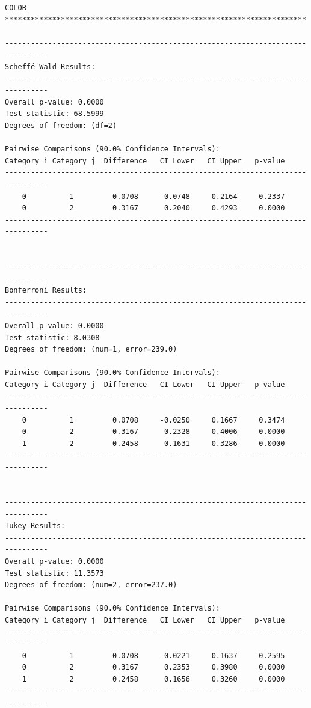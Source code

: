 \begin{lstlisting}
COLOR **********************************************************************

--------------------------------------------------------------------------------
Scheffé-Wald Results:
--------------------------------------------------------------------------------
Overall p-value: 0.0000
Test statistic: 68.5999
Degrees of freedom: (df=2)

Pairwise Comparisons (90.0% Confidence Intervals):
Category i Category j  Difference   CI Lower   CI Upper   p-value  
--------------------------------------------------------------------------------
    0          1         0.0708     -0.0748     0.2164     0.2337  
    0          2         0.3167      0.2040     0.4293     0.0000  
--------------------------------------------------------------------------------


--------------------------------------------------------------------------------
Bonferroni Results:
--------------------------------------------------------------------------------
Overall p-value: 0.0000
Test statistic: 8.0308
Degrees of freedom: (num=1, error=239.0)

Pairwise Comparisons (90.0% Confidence Intervals):
Category i Category j  Difference   CI Lower   CI Upper   p-value  
--------------------------------------------------------------------------------
    0          1         0.0708     -0.0250     0.1667     0.3474  
    0          2         0.3167      0.2328     0.4006     0.0000  
    1          2         0.2458      0.1631     0.3286     0.0000  
--------------------------------------------------------------------------------


--------------------------------------------------------------------------------
Tukey Results:
--------------------------------------------------------------------------------
Overall p-value: 0.0000
Test statistic: 11.3573
Degrees of freedom: (num=2, error=237.0)

Pairwise Comparisons (90.0% Confidence Intervals):
Category i Category j  Difference   CI Lower   CI Upper   p-value  
--------------------------------------------------------------------------------
    0          1         0.0708     -0.0221     0.1637     0.2595  
    0          2         0.3167      0.2353     0.3980     0.0000  
    1          2         0.2458      0.1656     0.3260     0.0000  
--------------------------------------------------------------------------------


\end{lstlisting}
